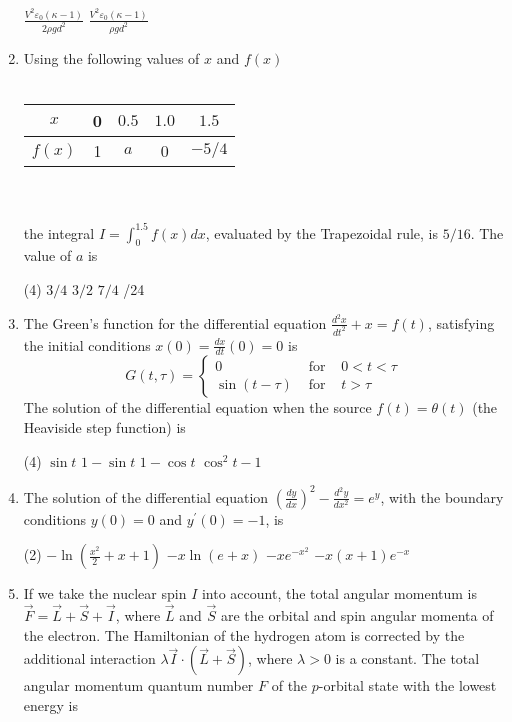 \begin{enumerate}
\begin{tasks}
	\task[\textbf{c.}]$\frac{V^{2} \varepsilon_{0}(\kappa-1)}{2 \rho g d^{2}}$
	\task[\textbf{d.}] $\frac{V^{2} \varepsilon_{0}(\kappa-1)}{\rho g d^{2}}$
\end{tasks}
\item  Using the following values of $x$ and $f(x)$\\\\
\begin{tabular}{|c|c|c|c|c|}
	\hline$x$ & 0 & $0.5$ & $1.0$ & $1.5$ \\
	\hline$f(x)$ & 1 & $a$ & 0 & $-5 / 4$ \\
	\hline
\end{tabular}\\\\
the integral $I=\int_{0}^{1.5} f(x) d x$, evaluated by the Trapezoidal rule, is $5 / 16$. The value of $a$ is
 \begin{tasks}(4)
	\task[\textbf{a.}]$3 / 4$
	\task[\textbf{b.}]$3 / 2$
	\task[\textbf{c.}] $7 / 4$
	/24
\end{tasks}
\item The Green's function for the differential equation $\frac{d^{2} x}{d t^{2}}+x=f(t)$, satisfying the initial conditions $x(0)=\frac{d x}{d t}(0)=0$ is
$$
G(t, \tau)=\left\{\begin{array}{llc}
0 & \text { for } & 0<t<\tau \\
\sin (t-\tau) & \text { for } & t>\tau
\end{array}\right.
$$
The solution of the differential equation when the source $f(t)=\theta(t)$ (the Heaviside step function) is
 \begin{tasks}(4)
	\task[\textbf{a.}]$\sin t$
	\task[\textbf{b.}]$1-\sin t$
	\task[\textbf{c.}]$1-\cos t$
	\task[\textbf{d.}]$\cos ^{2} t-1$ 
\end{tasks}
\item The solution of the differential equation $\left(\frac{d y}{d x}\right)^{2}-\frac{d^{2} y}{d x^{2}}=e^{y}$, with the boundary conditions $y(0)=0$ and $y^{\prime}(0)=-1$, is
 \begin{tasks}(2)
	\task[\textbf{a.}]$-\ln \left(\frac{x^{2}}{2}+x+1\right)$
	\task[\textbf{b.}]$-x \ln (e+x)$
	\task[\textbf{c.}]$-x e^{-x^{2}}$
	\task[\textbf{d.}] $-x(x+1) e^{-x}$
\end{tasks}
\item  If we take the nuclear spin $I$ into account, the total angular momentum is $\vec{F}=\vec{L}+\vec{S}+\vec{I}$, where $\vec{L}$ and $\vec{S}$ are the orbital and spin angular momenta of the electron. The Hamiltonian of the hydrogen atom is corrected by the additional interaction $\lambda \vec{I} \cdot(\vec{L}+\vec{S})$, where $\lambda>0$ is a constant. The total angular momentum quantum number $F$ of the $p$-orbital state with the lowest energy is

\end{enumerate}
